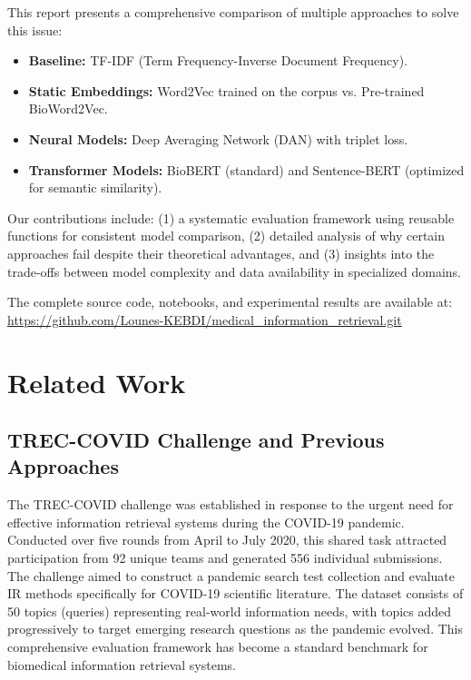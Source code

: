 \documentclass[sigconf,nonacm]{acmart}
\begin{document}
This report presents a comprehensive comparison of multiple approaches to solve this issue:
\begin{itemize}
    \item \textbf{Baseline:} TF-IDF (Term Frequency-Inverse Document Frequency).
    \item \textbf{Static Embeddings:} Word2Vec trained on the corpus vs. Pre-trained BioWord2Vec.
    \item \textbf{Neural Models:} Deep Averaging Network (DAN) with triplet loss.
    \item \textbf{Transformer Models:} BioBERT (standard) and Sentence-BERT (optimized for semantic similarity).
\end{itemize}

Our contributions include: (1) a systematic evaluation framework using reusable functions for consistent model comparison, (2) detailed analysis of why certain approaches fail despite their theoretical advantages, and (3) insights into the trade-offs between model complexity and data availability in specialized domains.

The complete source code, notebooks, and experimental results are available at: \url{https://github.com/Lounes-KEBDI/medical_information_retrieval.git}

\section{Related Work}

\subsection{TREC-COVID Challenge and Previous Approaches}
The TREC-COVID challenge \cite{roberts2021searching} was established in response to the urgent need for effective information retrieval systems during the COVID-19 pandemic. Conducted over five rounds from April to July 2020, this shared task attracted participation from 92 unique teams and generated 556 individual submissions. The challenge aimed to construct a pandemic search test collection and evaluate IR methods specifically for COVID-19 scientific literature. The dataset consists of 50 topics (queries) representing real-world information needs, with topics added progressively to target emerging research questions as the pandemic evolved. This comprehensive evaluation framework has become a standard benchmark for biomedical information retrieval systems.
\end{document}
